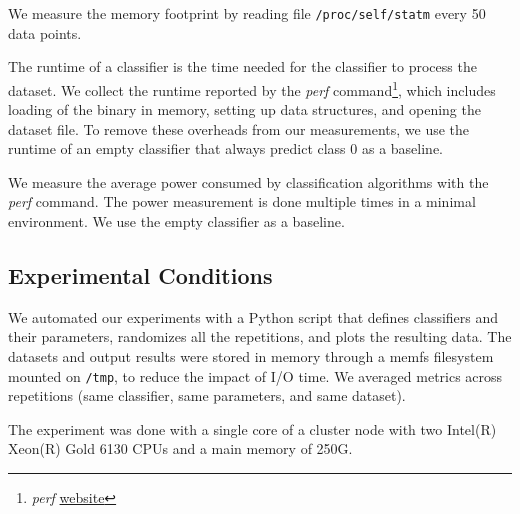 We measure the memory footprint by reading file
\texttt{/proc/self/statm} every 50 data points.

The runtime of a classifier is the time needed for
the classifier to process the dataset. We
collect the runtime reported by the \textit{perf}
command\footnote{\textit{perf}
\href{https://perf.wiki.kernel.org/index.php/Main_Page}{website}}, which
includes loading of the binary in memory, setting up data structures, and
opening the dataset file. To remove these overheads from our measurements,
we use the runtime of an empty classifier that always predict class 0 as a baseline.

We measure the average power consumed by classification
algorithms with the \textit{perf} command. The power measurement is done
multiple times in a minimal environment. We use the empty classifier as a
baseline.

\subsection{Experimental Conditions }
We automated our experiments with a Python script that defines classifiers and
their parameters, randomizes all the repetitions, and plots the resulting data.
The datasets and output results were stored in memory through a memfs filesystem
mounted on \texttt{/tmp}, to reduce the impact of I/O time.  We averaged metrics
across repetitions (same classifier, same parameters, and same dataset).

The experiment was done with a single core of a cluster node with two Intel(R)
Xeon(R) Gold 6130 CPUs and a main memory of 250G. 


